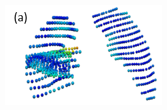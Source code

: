 \documentclass[]{spie}  %
\begin{document}
{\begin{figure}[htbp] 
\centering
\begin{subfigure}{
  \begin{minipage}[t]{0.23\linewidth}
  \includegraphics[width=\linewidth,trim={{.0\wd0} {.0\wd0} {.0\wd0} {.0\wd0}},clip]{Image/QuanlititativeResult1.png} %
  \centerline{}
	\end{minipage}%
   }%
  \label{fig:QuanlititativeResult-a} 
\end{subfigure} 
\begin{subfigure}{
  \begin{minipage}[t]{0.21\linewidth}

\end{minipage}}
\end{subfigure}
\end{figure}}
\end{document}
